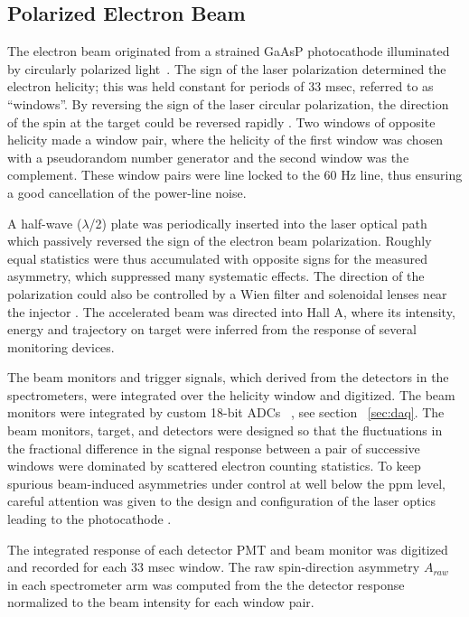 
\subsection{Polarized Electron Beam}\label{sec:app_electronbeam}

The electron beam originated from a strained GaAsP 
photocathode illuminated by 
circularly polarized light~\cite{Sinclair2007}.
The sign of the laser polarization determined the electron
helicity; this was held constant for periods of 33 msec,
referred to as ``windows''.
By reversing the sign of the laser circular 
polarization, the direction of the spin at the target could be 
reversed rapidly \cite{Paschke:2007zz}.
Two windows of opposite helicity made a window pair, where
the helicity of the first window was chosen with a pseudorandom
number generator and the second window was the complement.
These window pairs were line locked to the 60 Hz line,
thus ensuring a good cancellation of the power-line noise. 
 
A half-wave ($\lambda$/2) plate was periodically inserted into the 
laser optical path which passively reversed the
sign of the electron beam polarization. 
Roughly equal statistics were thus 
accumulated with opposite signs for the measured asymmetry, 
which suppressed many systematic effects.  
The direction of the polarization could also be
controlled by a Wien filter and solenoidal lenses
near the injector \cite{GramesWien2011}.  The accelerated beam was 
directed into Hall A, where its intensity, energy and trajectory on 
target were inferred from the response of several monitoring devices.

The beam monitors and trigger signals, which derived from
the detectors in the spectrometers, 
were integrated over the helicity window
and digitized.  The beam monitors were integrated by
custom 18-bit ADCs ~\cite{ref:prex}, see section ~\ref{sec:daq}.
The beam monitors, target, and detectors were designed so that
the fluctuations in the fractional difference in 
the signal response between
a pair of successive windows were
dominated by scattered electron counting statistics.
To keep spurious beam-induced asymmetries under
control at well below the ppm level, 
careful attention was given to the design and configuration of the laser 
optics leading to the photocathode \cite{Paschke:2007zz}.

The integrated response of each detector PMT and beam monitor
was digitized and recorded for each 33 msec window.
The raw spin-direction asymmetry $A_{raw}$
in each spectrometer arm was computed from the the detector response
normalized to the beam intensity 
for each window pair. 


